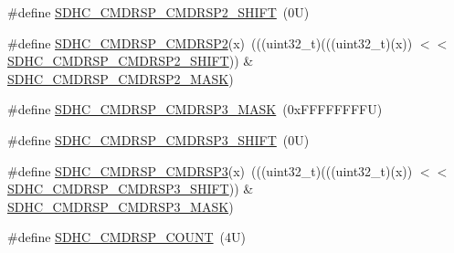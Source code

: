 \begin{DoxyCompactItemize}
\item 
\#define \mbox{\hyperlink{group___s_d_h_c___register___masks_ga68102815f97db907271c9feb9b35d48f}{S\+D\+H\+C\+\_\+\+C\+M\+D\+R\+S\+P\+\_\+\+C\+M\+D\+R\+S\+P2\+\_\+\+S\+H\+I\+FT}}~(0\+U)
\item 
\#define \mbox{\hyperlink{group___s_d_h_c___register___masks_ga6cd881a6a37704b8eb197856111608b6}{S\+D\+H\+C\+\_\+\+C\+M\+D\+R\+S\+P\+\_\+\+C\+M\+D\+R\+S\+P2}}(x)~(((uint32\+\_\+t)(((uint32\+\_\+t)(x)) $<$$<$ \mbox{\hyperlink{group___s_d_h_c___register___masks_ga68102815f97db907271c9feb9b35d48f}{S\+D\+H\+C\+\_\+\+C\+M\+D\+R\+S\+P\+\_\+\+C\+M\+D\+R\+S\+P2\+\_\+\+S\+H\+I\+FT}})) \& \mbox{\hyperlink{group___s_d_h_c___register___masks_ga60782d85358658786d1a76fe99379622}{S\+D\+H\+C\+\_\+\+C\+M\+D\+R\+S\+P\+\_\+\+C\+M\+D\+R\+S\+P2\+\_\+\+M\+A\+SK}})
\item 
\#define \mbox{\hyperlink{group___s_d_h_c___register___masks_ga455887881ffdaa8edd983e6e68ffe4d2}{S\+D\+H\+C\+\_\+\+C\+M\+D\+R\+S\+P\+\_\+\+C\+M\+D\+R\+S\+P3\+\_\+\+M\+A\+SK}}~(0x\+F\+F\+F\+F\+F\+F\+F\+F\+U)
\item 
\#define \mbox{\hyperlink{group___s_d_h_c___register___masks_ga5b08d155eccc29ab8f8ff62bc10a23a1}{S\+D\+H\+C\+\_\+\+C\+M\+D\+R\+S\+P\+\_\+\+C\+M\+D\+R\+S\+P3\+\_\+\+S\+H\+I\+FT}}~(0\+U)
\item 
\#define \mbox{\hyperlink{group___s_d_h_c___register___masks_ga025b72392ed5a288a1cd4482e6d66c8d}{S\+D\+H\+C\+\_\+\+C\+M\+D\+R\+S\+P\+\_\+\+C\+M\+D\+R\+S\+P3}}(x)~(((uint32\+\_\+t)(((uint32\+\_\+t)(x)) $<$$<$ \mbox{\hyperlink{group___s_d_h_c___register___masks_ga5b08d155eccc29ab8f8ff62bc10a23a1}{S\+D\+H\+C\+\_\+\+C\+M\+D\+R\+S\+P\+\_\+\+C\+M\+D\+R\+S\+P3\+\_\+\+S\+H\+I\+FT}})) \& \mbox{\hyperlink{group___s_d_h_c___register___masks_ga455887881ffdaa8edd983e6e68ffe4d2}{S\+D\+H\+C\+\_\+\+C\+M\+D\+R\+S\+P\+\_\+\+C\+M\+D\+R\+S\+P3\+\_\+\+M\+A\+SK}})
\item 
\#define \mbox{\hyperlink{group___s_d_h_c___register___masks_ga76b09e1dd51e8f80981ec00e6288af2e}{S\+D\+H\+C\+\_\+\+C\+M\+D\+R\+S\+P\+\_\+\+C\+O\+U\+NT}}~(4\+U)
\end{DoxyCompactItemize}
